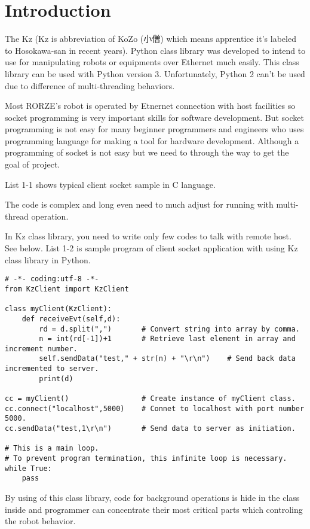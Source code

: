 \documentclass[a4paper,10pt]{jsarticle}
\begin{document}
\section{Introduction}
The Kz (Kz is abbreviation of KoZo (小僧) which means apprentice it's labeled to Hosokawa-san in recent years). Python class library was developed to intend to use for manipulating robots or equipments over Ethernet much easily.
This class library can be used with Python version 3. Unfortunately, Python 2 can't be used due to difference of multi-threading behaviors.

Most RORZE's robot is operated by Etnernet connection with host facilities so socket programming is very important skills for software development. But socket programming is not easy for many beginner programmers and engineers who uses programming language for making a tool for hardware development.
Although a programming of socket is not easy but we need to through the way to get the  goal of project.

List 1-1 shows typical client socket sample in C language.

The code is complex and long even  need to much adjust for running with multi-thread operation.

In Kz class library, you need to write only few codes to talk with remote host. See below. List 1-2 is sample program of client socket application with using Kz class library in Python.
\begin{verbatim}
# -*- coding:utf-8 -*-
from KzClient import KzClient

class myClient(KzClient):
    def receiveEvt(self,d):
        rd = d.split(",")       # Convert string into array by comma.
        n = int(rd[-1])+1       # Retrieve last element in array and increment number.
        self.sendData("test," + str(n) + "\r\n")    # Send back data incremented to server.
        print(d)

cc = myClient()                 # Create instance of myClient class.
cc.connect("localhost",5000)    # Connet to localhost with port number 5000.
cc.sendData("test,1\r\n")       # Send data to server as initiation.

# This is a main loop.
# To prevent program termination, this infinite loop is necessary.
while True:
    pass
\end{verbatim}
By using of this class library, code for background operations is hide in the class inside and programmer can concentrate their most critical parts which controling the robot behavior.
\end{document}
